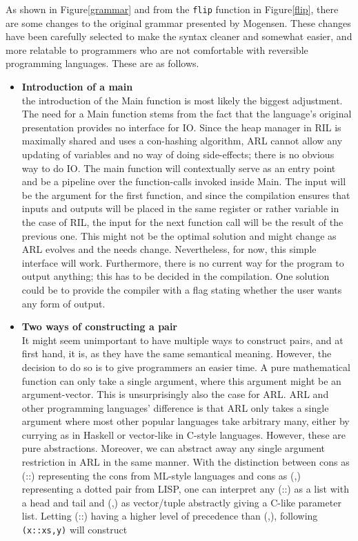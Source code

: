 \documentclass[a4paper]{article}
\begin{document}
As shown in Figure\ref{grammar} and from the \texttt{flip} function in Figure\ref{flip}, there are some changes to the original grammar presented by Mogensen. These changes have been carefully selected to make the syntax cleaner and somewhat easier, and more relatable to programmers who are not comfortable with reversible programming languages. These are as follows.
\begin{itemize}
\item \textbf{Introduction of a main}\\
the introduction of the Main function is most likely the biggest adjustment. The need for a Main function stems from the fact that the language's original presentation provides no interface for IO. Since the heap manager in RIL is maximally shared and uses a con-hashing algorithm, ARL cannot allow any updating of variables and no way of doing side-effects; there is no obvious way to do IO. The main function will contextually serve as an entry point and be a pipeline over the function-calls invoked inside Main. The input will be the argument for the first function, and since the compilation ensures that inputs and outputs will be placed in the same register or rather variable in the case of RIL, the input for the next function call will be the result of the previous one. This might not be the optimal solution and might change as ARL evolves and the needs change. Nevertheless, for now, this simple interface will work. Furthermore, there is no current way for the program to output anything; this has to be decided in the compilation. One solution could be to provide the compiler with a flag stating whether the user wants any form of output.
\item \textbf{Two ways of constructing a pair}\\
It might seem unimportant to have multiple ways to construct pairs, and at first hand, it is, as they have the same semantical meaning. However, the decision to do so is to give programmers an easier time. A pure mathematical function can only take a single argument, where this argument might be an argument-vector. This is unsurprisingly also the case for ARL. ARL and other programming languages' difference is that ARL only takes a single argument where most other popular languages take arbitrary many, either by currying as in Haskell or vector-like in C-style languages. However, these are pure abstractions. Moreover, we can abstract away any single argument restriction in ARL in the same manner. With the distinction between cons as (::) representing the cons from ML-style languages and cons as (,) representing a dotted pair from LISP, one can interpret any (::) as a list with a head and tail and (,) as vector/tuple abstractly giving a C-like parameter list. Letting (::) having a higher level of precedence than (,), following \verb+(x::xs,y)+ will construct


\end{itemize}
\end{document}
